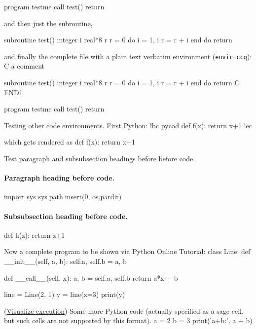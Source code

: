 \documentclass[%
oneside,                 %
final,                   %
10pt]{article}
\theoremstyle{definition}
\begin{document}
      program testme
      call test()
      return

\efcod

and then just the subroutine,
\bfcod

      subroutine test()
      integer i
      real*8 r
      r = 0
      do i = 1, i
         r = r + i
      end do
      return

\efcod

and finally the complete file with a plain text verbatim environment
(\texttt{envir=ccq}):
\bccq
C     a comment

      subroutine test()
      integer i
      real*8 r
      r = 0
      do i = 1, i
         r = r + i
      end do
      return
C     END1

      program testme
      call test()
      return

\eccq

Testing other code environments. First Python:
\bdo
!bc pycod
def f(x):
    return x+1
!ec

\edo

which gets rendered as
\bpycod
def f(x):
    return x+1

\epycod

Test paragraph and subsubsection headings before
before code.
\paragraph{Paragraph heading before code.}
\bpycod
import sys
sys.path.insert(0, os.pardir)

\epycod

\paragraph{Subsubsection heading before code.}
\bpycod
def h(z):
    return z+1

\epycod

Now a complete program to be shown via Python Online Tutorial:
\bpypro
class Line:
    def __init__(self, a, b):
        self.a, self.b = a, b

    def __call__(self, x):
        a, b = self.a, self.b
        return a*x + b

line = Line(2, 1)
y = line(x=3)
print(y)

\epypro

\noindent
(\href{{https://pythontutor.com/visualize.html\#code=class+Line\%3A\%0A++++def+__init__\%28self\%2C+a\%2C+b\%29\%3A\%0A++++++++self.a\%2C+self.b+\%3D+a\%2C+b\%0A\%0A++++def+__call__\%28self\%2C+x\%29\%3A\%0A++++++++a\%2C+b+\%3D+self.a\%2C+self.b\%0A++++++++return+a\%2Ax+\%2B+b\%0A\%0Aline+\%3D+Line\%282\%2C+1\%29\%0Ay+\%3D+line\%28x\%3D3\%29\%0Aprint\%28y\%29&mode=display&cumulative=false&heapPrimitives=false&drawParentPointers=false&textReferences=false&py=2&curInstr=0}}{Visualize execution}) 
Some more Python code (actually specified as a sage cell, but
such cells are not supported by this format).
\bpypro
a = 2
b = 3
print('a+b:', a + b)
\end{document}
